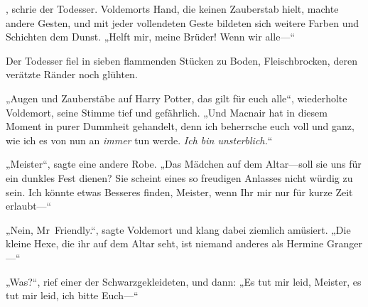 , schrie der Todesser.
Voldemorts Hand, die keinen Zauberstab hielt, machte andere Gesten, und mit jeder vollendeten Geste bildeten sich weitere Farben und Schichten dem Dunst.
„Helft mir, meine Brüder! Wenn wir alle—“

Der Todesser fiel in sieben flammenden Stücken zu Boden, Fleischbrocken, deren verätzte Ränder noch glühten.

„Augen und Zauberstäbe auf Harry Potter, das gilt für euch alle“, wiederholte Voldemort, seine Stimme tief und gefährlich. „Und Macnair hat in diesem Moment in purer Dummheit gehandelt, denn ich beherrsche euch voll und ganz, wie ich es von nun an \emph{immer} tun werde. \emph{Ich bin unsterblich.}“

„Meister“, sagte eine andere Robe. „Das Mädchen auf dem Altar—soll sie uns für ein dunkles Fest dienen? Sie scheint eines so freudigen Anlasses nicht würdig zu sein. Ich könnte etwas Besseres finden, Meister, wenn Ihr mir nur für kurze Zeit erlaubt—“

„Nein, Mr~Friendly.“, sagte Voldemort und klang dabei ziemlich amüsiert. „Die kleine Hexe, die ihr auf dem Altar seht, ist niemand anderes als Hermine Granger—“

„Was?“, rief einer der Schwarzgekleideten, und dann: „Es tut mir leid, Meister, es tut mir leid, ich bitte Euch—“


